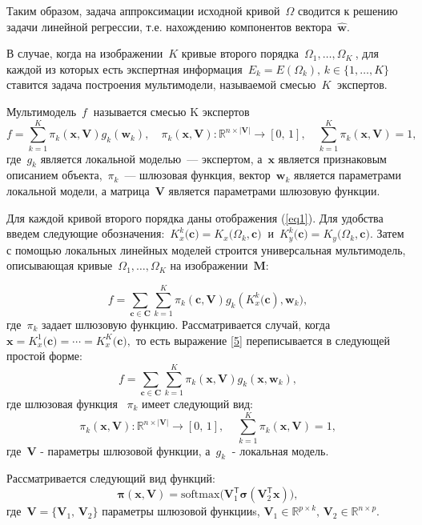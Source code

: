 Таким образом, задача аппроксимации исходной кривой~$\Omega$ сводится к решению задачи линейной регрессии, т.е. нахождению компонентов вектора~$\hat{\mathbf{w}}$.

В случае, когда на изображении~$K$ кривые второго порядка~$\Omega_1, \dots, \Omega_K~$, для каждой из которых есть экспертная информация~$E_k = E(\Omega_k), \, k \in \{ 1, \dots, K \}~$ ставится задача построения мультимодели, называемой смесью~$ K~$ экспертов.

\begin{definition}
Мультимодель~$ f~$ называется смесью K экспертов
\[
	f = \sum\limits_{k = 1}^{K}\pi_k(\mathbf{x}, \mathbf{V})g_k(\mathbf{w}_k),  \quad \pi_k(\mathbf{x}, \mathbf{V}): \mathbb{R}^{n\times |\mathbf{V}|} \rightarrow [0, \, 1], \quad \sum\limits_{k = 1}^{K}\pi_k(\mathbf{x}, \mathbf{V}) = 1, 
\]
где~$g_k$ является локальной моделью~--- экспертом, а~$\mathbf{x}$ является признаковым описанием объекта,~$\pi_k$~--- шлюзовая функция, вектор~$\mathbf{w}_k$ является параметрами локальной модели, а матрица~$\mathbf{V}$ является параметрами шлюзовую функции.
\end{definition}

Для каждой кривой второго порядка даны отображения (\ref{eq1}). Для удобства введем следующие обозначения:~$ K_x^k \bigr(\mathbf{c} \bigr) = K_x \bigr (\Omega_k, \mathbf{c} \bigr)~$ и~$K_y^k \bigr (\mathbf{c}\bigr) = K_y\bigr(\Omega_k, \mathbf{c}\bigr)$.
Затем с помощью локальных линейных моделей строится универсальная мультимодель, описывающая кривые~$\Omega_1, \dots, \Omega_K$ на изображении~$\mathbf{M}$:

\[
\label{5}
	f = \sum\limits_{\mathbf{c} \in \mathbf{C}} \sum_{k = 1}^{K} \pi_k(\mathbf{c}, \mathbf{V})g_k(K^k_{x}\bigl(\mathbf{c}), \mathbf{w}_k), 
\]
где~$\pi_k$ задает шлюзовую функцию. Рассматривается случай, когда~$\mathbf{x}=K^1_{x}\bigl(\mathbf{c})=\cdots=K^K_{x}\bigl(\mathbf{c}),$ то есть выражение \eqref{5} переписывается в следующей простой форме:
\[
\label{5_1}
	f = \sum\limits_{\mathbf{c} \in \mathbf{C}} \sum_{k = 1}^{K} \pi_k(\mathbf{x}, \mathbf{V})g_k(\mathbf{x}, \mathbf{w}_k), 
\]
где шлюзовая функция ~$\pi_k$ имеет следующий вид:
\[
\label{6}
	\pi_k(\mathbf{x}, \mathbf{V}): \mathbb{R}^{n\times |\mathbf{V}|} \rightarrow [0, \, 1], \; \; \; \; \sum\limits_{k = 1}^{K}\pi_k(\mathbf{x}, \mathbf{V}) = 1,
\]
где~$\mathbf{V}$ - параметры шлюзовой функции, а~$ g_k~$ - локальная модель.
    
Рассматривается следующий вид функций:
\[
    \boldsymbol{\pi}(\mathbf{x}, \mathbf{V}) = \text{softmax}\bigl(\mathbf{V}_1^{\mathsf{T}}\boldsymbol{\sigma}(\mathbf{V}_2^{\mathsf{T}}\mathbf{x}) \bigr),
\]
где~$\mathbf{V} = \{ \mathbf{V}_1, \, \mathbf{V}_2\}$ параметры шлюзовой функцииs,
$\mathbf{V}_1 \in \mathbb{R}^{p \times k}, \, \mathbf{V}_2 \in \mathbb{R}^{n \times p}$. 

